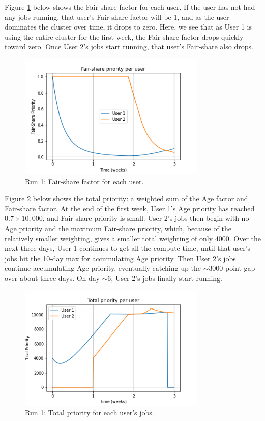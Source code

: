 \documentclass{article}
\begin{document}
Figure \ref{fig:one-fs} below shows the Fair-share factor for each
user.  If the user has not had any jobs running, that user's
Fair-share factor will be 1, and as the user dominates the cluster
over time, it drops to zero.  Here, we see that as User 1 is using the
entire cluster for the first week, the Fair-share factor drops quickly
toward zero.  Once User 2's jobs start running, that user's Fair-share
also drops.
\begin{figure}[h!]
  \begin{center}
    \includegraphics[width=0.8\textwidth]{sim-1-fairshare}
  \end{center}
  \caption{Run 1: Fair-share factor for each user.
    \label{fig:one-fs}}
\end{figure}
\newpage
Figure \ref{fig:one-prio} below shows the total priority: a weighted
sum of the Age factor and Fair-share factor.  At the end of the first
week, User 1's Age priority has reached $0.7 \times 10,000$, and
Fair-share priority is small.  User 2's jobs then begin with no Age
priority and the maximum Fair-share priority, which, because of the
relatively smaller weighting, gives a smaller total weighting of only
$4000$.  Over the next three days, User 1 continues to get all the
compute time, until that user's jobs hit the 10-day max for
accumulating Age priority.  Then User 2's jobs continue accumulating
Age priority, eventually catching up the $\sim3000$-point gap over
about three days.  On day $\sim6$, User 2's jobs finally start running.
\begin{figure}[h!!]
  \begin{center}
    \includegraphics[width=0.8\textwidth]{sim-1-prio}
  \end{center}
  \caption{Run 1: Total priority for each user's jobs.
    \label{fig:one-prio}}
\end{figure}
\end{document}
